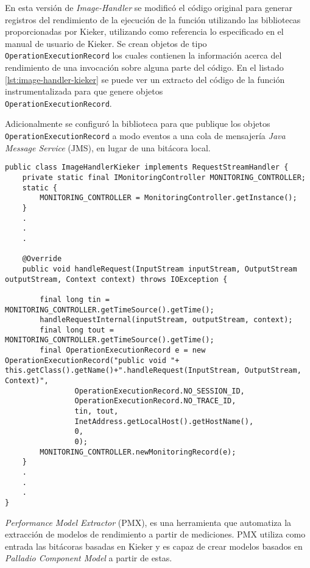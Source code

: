 En esta versión de \emph{Image-Handler} se modificó el código original para generar registros del rendimiento de la ejecución de la función utilizando las bibliotecas proporcionadas por Kieker, utilizando como referencia lo especificado en el manual de usuario de Kieker\cite{kieker-user-guide}. Se crean objetos de tipo \texttt{OperationExecutionRecord} los cuales contienen la información acerca del rendimiento de una invocación sobre alguna parte del código.  En el listado \ref{lst:image-handler-kieker} se puede ver un extracto del código de la función instrumentalizada para que genere objetos\\ \texttt{OperationExecutionRecord}.

Adicionalmente se configuró la biblioteca para que publique los objetos\\ \texttt{OperationExecutionRecord} a modo eventos a una cola de mensajería \emph{Java Message Service} (JMS), en lugar de una bitácora local.

\begin{minipage}[c]{\linewidth}
\begin{lstlisting}[caption={Extracto de la clase \texttt{ImageHandler.java} instrumentalizada con Kieker}, label={lst:image-handler-kieker}]
public class ImageHandlerKieker implements RequestStreamHandler {
    private static final IMonitoringController MONITORING_CONTROLLER;
    static {
        MONITORING_CONTROLLER = MonitoringController.getInstance();
    }
    .
    .
    .
    
    @Override
    public void handleRequest(InputStream inputStream, OutputStream outputStream, Context context) throws IOException {

        final long tin = MONITORING_CONTROLLER.getTimeSource().getTime();
        handleRequestInternal(inputStream, outputStream, context);
        final long tout = MONITORING_CONTROLLER.getTimeSource().getTime();
        final OperationExecutionRecord e = new OperationExecutionRecord("public void "+ this.getClass().getName()+".handleRequest(InputStream, OutputStream, Context)",
                OperationExecutionRecord.NO_SESSION_ID,
                OperationExecutionRecord.NO_TRACE_ID,
                tin, tout,
                InetAddress.getLocalHost().getHostName(),
                0,
                0);
        MONITORING_CONTROLLER.newMonitoringRecord(e);
    }
    .
    .
    .
}    
\end{lstlisting}
\end{minipage}

\emph{Performance Model Extractor} (PMX), es una herramienta que automatiza la extracción de modelos de rendimiento a partir de mediciones. PMX utiliza como entrada las bitácoras basadas en Kieker y es capaz de crear modelos basados en \emph{Palladio Component Model} a partir de estas. 


